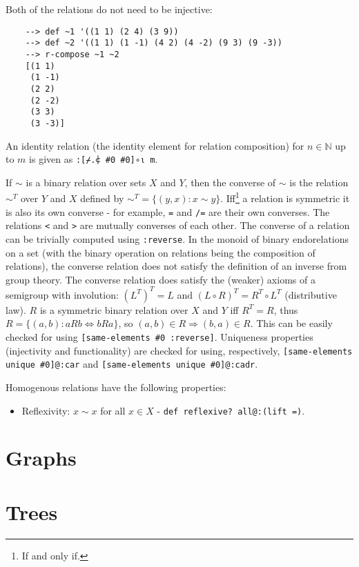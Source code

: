 Both of the relations do not need to be injective:

\begin{Verbatim}
    --> def ~1 '((1 1) (2 4) (3 9))
    --> def ~2 '((1 1) (1 -1) (4 2) (4 -2) (9 3) (9 -3))
    --> r-compose ~1 ~2
    [(1 1)
     (1 -1)
     (2 2)
     (2 -2)
     (3 3)
     (3 -3)]
\end{Verbatim}

An identity relation (the identity element for relation composition) for $n \in \mathbb{N}$ up to $m$ is given as \verb|:[⌿.⍧ #0 #0]∘⍳ m|.

If $\sim$ is a binary relation over sets $X$ and $Y$, then the converse of $\sim$ is the relation $\sim^T$ over $Y$ and $X$ defined by $\displaystyle \sim^T = \{(y,x):x\sim y\}$. Iff\footnote{If and only if.} a relation is symmetric it is also its own converse - for example, \verb|=| and \verb|/=| are their own converses. The relations \verb|<| and \verb|>| are mutually converses of each other. The converse of a relation can be trivially computed using \verb|:reverse|. In the monoid of binary endorelations on a set (with the binary operation on relations being the composition of relations), the converse relation does not satisfy the definition of an inverse from group theory. The converse relation does satisfy the (weaker) axioms of a semigroup with involution: $\left(L^T\right)^T=L$ and $(L\circ R)^T=R^T\circ L^T$ (distributive law). $R$ is a symmetric binary relation over $X$ and $Y$ iff $R^T = R$, thus $R = \{(a,b): a R b \Leftrightarrow b R a \}$, so $(a,b)\in R \Rightarrow (b,a)\in R$. This can be easily checked for using \verb|[same-elements #0 :reverse]|. Uniqueness properties (injectivity and functionality) are checked for using, respectively, \verb|[same-elements unique #0]@:car| and \verb|[same-elements unique #0]@:cadr|.

Homogenous relations have the following properties:

\begin{itemize}
    \item Reflexivity: $x \sim x$ for all $x \in X$ - \verb|def reflexive? all@:(lift =)|.
\end{itemize}

\section{Graphs}

\section{Trees}
